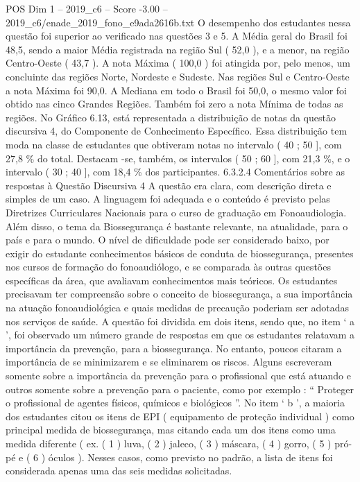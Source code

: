 \begin{textsample}{POS Dim 1 – 2019\_c6 – Score -3.00 – 2019\_c6/enade\_2019\_fono\_e9ada2616b.txt}
O desempenho dos estudantes nessa questão foi superior ao verificado nas questões 3 e 5.
A Média geral do Brasil foi 48,5, sendo a maior Média registrada na região Sul ( 52,0 ), e a menor, na região Centro-Oeste ( 43,7 ).
A nota Máxima ( 100,0 ) foi atingida por, pelo menos, um concluinte das regiões Norte, Nordeste e Sudeste.
Nas regiões Sul e Centro-Oeste a nota Máxima foi 90,0.
A Mediana em todo o Brasil foi 50,0, o mesmo valor foi obtido nas cinco Grandes Regiões.
Também foi zero a nota Mínima de todas as regiões.
No Gráfico 6.13, está representada a distribuição de notas da questão discursiva 4, do Componente de Conhecimento Específico.
Essa distribuição tem moda na classe de estudantes que obtiveram notas no intervalo ( 40 ; 50 ], com 27,8 \% do total.
Destacam -se, também, os intervalos ( 50 ; 60 ], com 21,3 \%, e o intervalo ( 30 ; 40 ], com 18,4 \% dos participantes. 6.3.2.4 Comentários sobre as respostas à Questão Discursiva 4 A questão era clara, com descrição direta e simples de um caso.
A linguagem foi adequada e o conteúdo é previsto pelas Diretrizes Curriculares Nacionais para o curso de graduação em Fonoaudiologia.
Além disso, o tema da Biossegurança é bastante relevante, na atualidade, para o país e para o mundo.
O nível de dificuldade pode ser considerado baixo, por exigir do estudante conhecimentos básicos de conduta de biossegurança, presentes nos cursos de formação do fonoaudiólogo, e se comparada às outras questões específicas da área, que avaliavam conhecimentos mais teóricos.
Os estudantes precisavam ter compreensão sobre o conceito de biossegurança, a sua importância na atuação fonoaudiológica e quais medidas de precaução poderiam ser adotadas nos serviços de saúde.
A questão foi dividida em dois itens, sendo que, no item ‘ a ’, foi observado um número grande de respostas em que os estudantes relatavam a importância da prevenção, para a biossegurança.
No entanto, poucos citaram a importância de se minimizarem e se eliminarem os riscos.
Alguns escreveram somente sobre a importância da prevenção para o profissional que está atuando e outros somente sobre a prevenção para o paciente, como por exemplo : “ Proteger o profissional de agentes físicos, químicos e biológicos ”.
No item ‘ b ’, a maioria dos estudantes citou os itens de EPI ( equipamento de proteção individual ) como principal medida de biossegurança, mas citando cada um dos itens como uma medida diferente ( ex. ( 1 ) luva, ( 2 ) jaleco, ( 3 ) máscara, ( 4 ) gorro, ( 5 ) pró-pé e ( 6 ) óculos ).
Nesses casos, como previsto no padrão, a lista de itens foi considerada apenas uma das seis medidas solicitadas.

\end{textsample}
